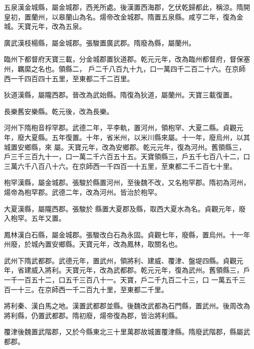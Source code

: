 \begin{pinyinscope}
 五泉漢金城縣，屬金城郡，西羌所處。後漢置西海郡，乞伏乾歸都此，稱涼。隋開皇初，置蘭州，以皋蘭山為名。煬帝改金城郡。隋置五泉縣。咸亨二年，復為金城。天寶元年，改為五泉。



 廣武漢枝楊縣，屬金城郡。張駿置廣武郡。隋廢為縣，屬蘭州。



 臨州下都督府天寶三載，分金城郡置狄道郡。乾元元年，改為臨州都督府，督保塞州，羈縻之名也。領縣二，
 戶二千八百九十九，口一萬四千二百二十六。在京師西一千四百四十五里，至東都二千二百里。



 狄道漢縣，屬隴西郡。晉改為武始縣。隋復為狄道，屬蘭州。天寶三載復置。



 長樂舊安樂縣。乾元後，改為長樂。



 河州下隋枹音桴罕郡。武德二年，平李軌，置河州，領枹罕、大夏二縣。貞觀元年，廢大夏縣。五年復置。十年，省米州，以米川縣來屬。十一年，廢烏州，以其城置安鄉縣，來
 屬。天寶元年，改為安鄉郡。乾元元年，復為河州。舊領縣三，戶三千三百九十一，口一萬二千六百五十五。天寶領縣三，戶五千七百八十二，口三萬六千八百八十六。在京師西一千四百一十五里，至東都二千二百七十里。



 枹罕漢縣，屬金城郡。張駿於縣置河州，至後魏不改，又名枹罕郡。隋初為河州，煬帝為枹罕郡。武德二年，改為河州。皆治於枹罕。



 大夏漢縣，屬隴西郡。張駿於
 縣置大夏郡及縣，取西大夏水為名。貞觀元年，廢入枹罕。五年又置。



 鳳林漢白石縣，屬金城郡。張駿改白石為永固。貞觀七年，廢縣，置烏州。十一年州廢，於城內置安鄉縣。天寶元年，改為鳳林，取關名也。



 武州下隋武都郡。武德元年，置武州，領將利、建威、覆津、盤堤四縣。貞觀元年，省建威入將利。天寶元年，改為武都郡。乾元元年，復為武州。舊領縣三，戶一千一百五十二，口五千三百八十一。天寶，戶二千九百二十三，口
 一萬五千三百一十三。在京師西一千二百九十里，至東都二千里。



 將利秦、漢白馬之地。漢置武都郡並縣。後魏改武都為石門縣，置武州。後周改為將利縣，仍置武都郡。隋初廢，煬帝復為郡，皆治將利縣。



 覆津後魏置武階郡，又於今縣東北三十里萬郡故城置覆津縣。隋廢武階郡，縣屬武都郡。




\end{pinyinscope}
